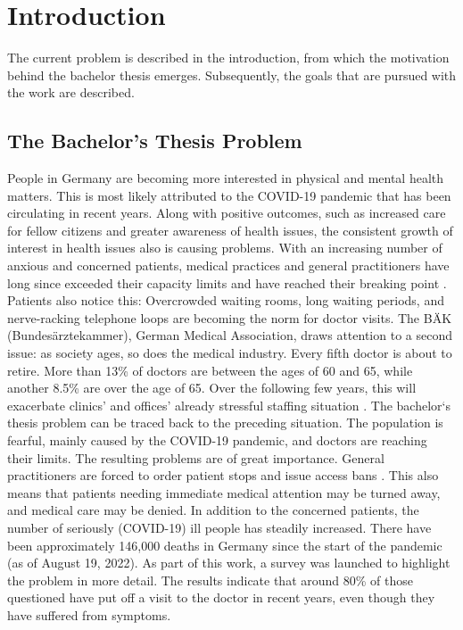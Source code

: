 

\chapter{Introduction}
The current problem is described in the introduction, from which the motivation behind the bachelor thesis emerges. Subsequently, the goals that are pursued with the work are described.

\section{The Bachelor's Thesis Problem}
People in Germany are becoming more interested in physical and mental health matters. This is most likely attributed to the COVID-19 pandemic that has been circulating in recent years. \cite{.bahn-bonn} Along with positive outcomes, such as increased care for fellow citizens \cite{.bahn-bonn} and greater awareness of health issues, the consistent growth of interest in health issues also is causing problems. With an increasing number of anxious and concerned patients, medical practices and general practitioners have long since exceeded their capacity limits and have reached their breaking point \cite{.sok}. Patients also notice this: Overcrowded waiting rooms, long waiting periods, and nerve-racking telephone loops are becoming the norm for doctor visits. The BÄK (Bundesärztekammer), German Medical Association, draws attention to a second issue: as society ages, so does the medical industry. Every fifth doctor is about to retire. More than 13\% of doctors are between the ages of 60 and 65, while another 8.5\% are over the age of 65. Over the following few years, this will exacerbate clinics' and offices' already stressful staffing situation \cite{.blatt}. 
The bachelor`s thesis problem can be traced back to the preceding situation. The population is fearful, mainly caused by the COVID-19 pandemic, and doctors are reaching their limits. The resulting problems are of great importance. General practitioners are forced to order patient stops and issue access bans \cite{.sok}. This also means that patients needing immediate medical attention may be turned away, and medical care may be denied. In addition to the concerned patients, the number of seriously (COVID-19) ill people has steadily increased. There have been approximately 146,000 deaths in Germany since the start of the pandemic (as of August 19, 2022). \cite{.rki} As part of this work, a survey was launched to highlight the problem in more detail. The results indicate that around 80\% of those questioned have put off a visit to the doctor in recent years, even though they have suffered from symptoms.

